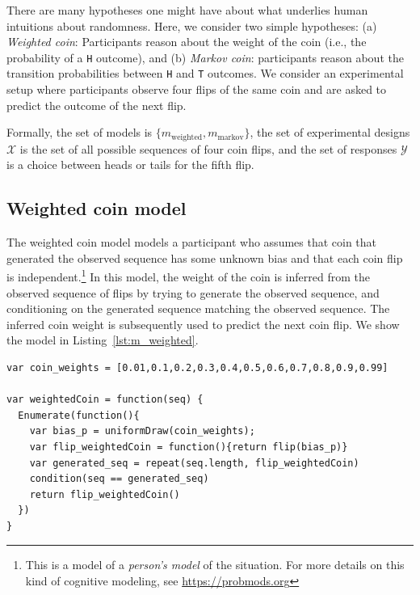 \documentclass{article}
\begin{document}
There are many hypotheses one might have about what underlies human intuitions about randomness.
Here, we consider two simple hypotheses: (a) \emph{Weighted coin}: Participants reason about the weight of the coin (i.e., the probability of a \lstinline{H} outcome), and (b) \emph{Markov coin}: participants reason about the transition probabilities between \lstinline{H} and \lstinline{T} outcomes.
We consider an experimental setup where participants observe four flips of the same coin and are asked to predict the outcome of the next flip.

Formally, the set of models is $\{m_{\text{weighted}}, m_{\text{markov}}\}$, the set of experimental designs $\mathcal{X}$ is the set of all possible sequences of four coin flips, and the set of responses $\mathcal{Y}$ is a choice between heads or tails for the fifth flip.

\subsection{Weighted coin model}
\label{s:tutorial:sss:biased}

The weighted coin model models a participant who assumes that coin that generated the observed sequence has some unknown bias and that each coin flip is independent.\footnote{This is a model of a \emph{person's model} of the situation. For more details on this kind of cognitive modeling, see \url{https://probmods.org}}
In this model, the weight of the coin is inferred from the observed sequence of flips by trying to generate the observed sequence, and conditioning on the generated sequence matching the observed sequence.
The inferred coin weight is subsequently used to predict the next coin flip. We show the model in Listing~\ref{lst:m_weighted}.

\begin{lstlisting}[caption=Biased coin model,  label={lst:m_weighted}]
var coin_weights = [0.01,0.1,0.2,0.3,0.4,0.5,0.6,0.7,0.8,0.9,0.99]

var weightedCoin = function(seq) {
  Enumerate(function(){
    var bias_p = uniformDraw(coin_weights);
    var flip_weightedCoin = function(){return flip(bias_p)}
    var generated_seq = repeat(seq.length, flip_weightedCoin)
    condition(seq == generated_seq)
    return flip_weightedCoin()
  })
}
\end{lstlisting}
\end{document}
